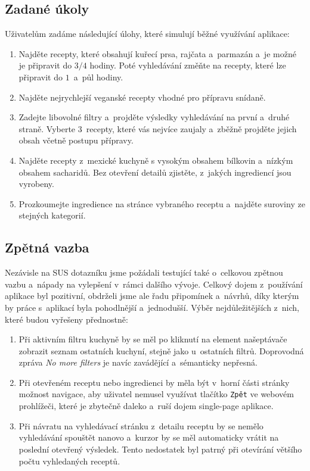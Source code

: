 \subsection{Zadané úkoly}

Uživatelům zadáme následující úlohy, které simulují běžné využívání aplikace:

\begin{enumerate}
    \item Najděte recepty, které obsahují kuřecí prsa, rajčata a~parmazán a~je možné je připravit do $3/4$ hodiny. Poté vyhledávání změňte na recepty, které lze připravit do $1$~a~půl hodiny.
    \item Najděte nejrychlejší veganské recepty vhodné pro přípravu snídaně.
    \item Zadejte libovolné filtry a~projděte výsledky vyhledávání na první a~druhé straně. Vyberte $3$~recepty, které vás nejvíce zaujaly a~zběžně projděte jejich obsah včetně postupu přípravy.
    \item Najděte recepty z~mexické kuchyně s vysokým obsahem bílkovin a~nízkým obsahem sacharidů. Bez otevření detailů zjistěte, z~jakých ingrediencí jsou vyrobeny.
    \item Prozkoumejte ingredience na stránce vybraného receptu a~najděte suroviny ze stejných kategorií.
\end{enumerate}

\subsection{Zpětná vazba}

Nezávisle na SUS dotazníku jsme požádali testující také o~celkovou zpětnou vazbu a~nápady na vylepšení v~rámci dalšího vývoje. Celkový dojem z~používání aplikace byl pozitivní, obdrželi jsme ale řadu připomínek a~návrhů, díky kterým by práce s~aplikací byla pohodlnější a~jednodušší. Výběr nejdůležitějších z~nich, které budou vyřešeny přednostně:

\begin{enumerate}
    \item Při aktivním filtru kuchyně by se měl po kliknutí na element našeptávače zobrazit seznam ostatních kuchyní, stejně jako u~ostatních filtrů. Doprovodná zpráva \emph{No more filters} je navíc zavádějící a~sémanticky nepřesná.
    \item Při otevřeném receptu nebo ingredienci by měla být v~horní části stránky možnost navigace, aby uživatel nemusel využívat tlačítko \texttt{Zpět} ve webovém prohlížeči, které je zbytečně daleko a~ruší dojem single-page aplikace.
    \item Při návratu na vyhledávací stránku z~detailu receptu by se nemělo vyhledávání spouštět nanovo a~kurzor by se měl automaticky vrátit na poslední otevřený výsledek. Tento nedostatek byl patrný při otevírání většího počtu vyhledaných receptů.
\end{enumerate}


